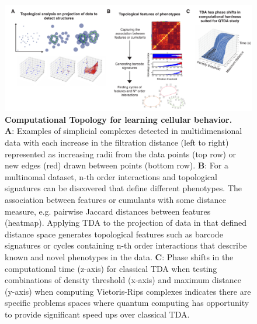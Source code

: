 \documentclass{article}
\begin{document}
\begin{figure}[htb!]
    \centering
\includegraphics[width=.95\columnwidth, keepaspectratio]{figures/ws4_overview.pdf}
    \caption{\textbf{Computational Topology for learning cellular behavior.}\\
    \textbf{A}: Examples of simplicial complexes detected in multidimensional data with each increase in the filtration distance (left to right) represented as increasing radii from the data points (top row) or new edges (red) drawn between points (bottom row). \textbf{B}: For a multinomal dataset, n-th order interactions and topological signatures can be discovered that define different phenotypes. The association between features or cumulants with some distance measure, e.g. pairwise Jaccard distances between features (heatmap). Applying TDA to the projection of data in that defined distance space generates topological features such as barcode signatures or cycles containing n-th order interactions that describe known and novel phenotypes in the data. \textbf{C}: Phase shifts in the computational time (z-axis) for classical TDA when testing combinations of density threshold (x-axis) and maximum distance (y-axis) when computing Vietoris-Rips complexes indicates there are specific problems spaces where quantum computing has opportunity to provide significant speed ups over classical TDA.\\
    }
    \label{fig:WS4overview}
\end{figure}
\end{document}
